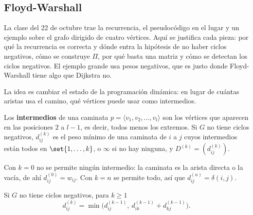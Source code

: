 \documentclass[11pt,letterpaper]{article}
\begin{document}

\subsection*{Floyd-Warshall}

La clase del 22 de octubre trae la recurrencia, el pseudocódigo en el
lugar y un ejemplo sobre el grafo dirigido de cuatro vértices. Aquí se
justifica cada pieza: por qué la recurrencia es correcta y dónde entra
la hipótesis de no haber ciclos negativos, cómo se construye $\Pi$,
por qué basta una matriz y cómo se detectan los ciclos negativos. El
ejemplo grande usa pesos negativos, que es justo donde Floyd-Warshall
tiene algo que Dijkstra no.

La idea es cambiar el estado de la programación dinámica: en lugar de
cuántas aristas usa el camino, qué vértices puede usar como
intermedios.

\begin{definicion}
  \label{def:intermedio-floyd}
  Los \textbf{intermedios} de una caminata
  $p = \langle v_1, v_2, \dots, v_l \rangle$ son los vértices que
  aparecen en las posiciones $2$ a $l - 1$, es decir, todos menos los
  extremos. Si $G$ no tiene ciclos negativos, $d^{(k)}_{ij}$ es el
  peso mínimo de una caminata de $i$ a $j$ cuyos intermedios están
  todos en $\set{1, \dots, k}$, o $\infty$ si no hay ninguna, y
  $D^{(k)} = (d^{(k)}_{ij})$.
\end{definicion}

Con $k = 0$ no se permite ningún intermedio: la caminata es la arista
directa o la vacía, de ahí $d^{(0)}_{ij} = w_{ij}$. Con $k = n$ se
permite todo, así que $d^{(n)}_{ij} = \delta(i, j)$.

\begin{lema}
  \label{lem:estructura-floyd}
  Si $G$ no tiene ciclos negativos, para $k \ge 1$
  \[
    d^{(k)}_{ij} = \min\bigl( d^{(k-1)}_{ij},\
                   d^{(k-1)}_{ik} + d^{(k-1)}_{kj} \bigr) .
  \]
\end{lema}
\end{document}
